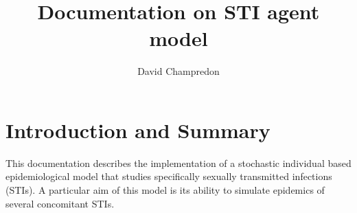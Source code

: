 \documentclass[11pt, onecolumn]{article}
\title{Documentation on STI agent model}
\author{David Champredon}
\begin{document}
\maketitle

\tableofcontents


\newpage

\section{Introduction and Summary}

This documentation describes the implementation of a stochastic individual based epidemiological model that studies specifically sexually transmitted infections (STIs). A particular aim of this model is its ability to simulate epidemics of several concomitant STIs.
\end{document}
